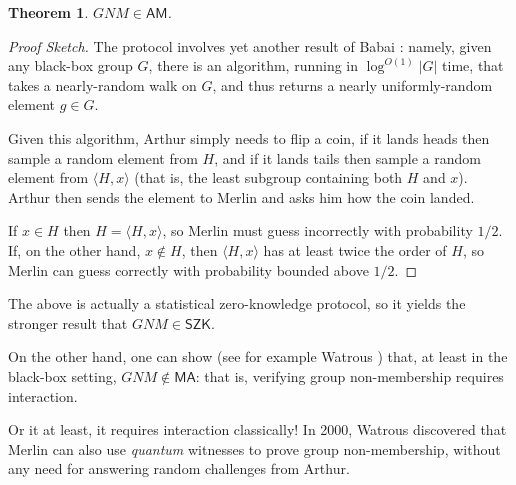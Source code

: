 \documentclass[12pt]{report}
\theoremstyle{plain}
\newtheorem{theorem}{Theorem}[section]
\theoremstyle{definition}
\begin{document}
\begin{theorem}
\label{gnmam}$GNM \in \mathsf{AM}$.
\end{theorem}
\begin{proof}[Proof Sketch] The protocol involves yet another result of Babai \cite{DBLP:conf/stoc/Babai91}: namely, given any black-box group $G$, there is an algorithm, running in $\log^{O(1)} |G|$ time, that takes a nearly-random walk on $G$, and thus returns a nearly uniformly-random element $g\in G$.

Given this algorithm, Arthur simply needs to flip a coin, if it lands heads then sample a random element from $H$, and if it lands tails then sample a random element from $\langle H,x\rangle$ (that is, the least subgroup containing both $H$ and $x$).  Arthur then sends the element to Merlin and asks him how the coin landed.

If $x\in H$ then $H = \langle H,x\rangle$, so Merlin must guess incorrectly with probability $1/2$.  If, on the other hand, $x\not\in H$, then $\langle H,x\rangle$ has at least twice the order of $H$, so Merlin can guess correctly with probability bounded above $1/2$.
\end{proof}

The above is actually a statistical zero-knowledge protocol, so it yields the stronger result that $GNM\in \mathsf{SZK}$.

On the other hand, one can show (see for example Watrous \cite{DBLP:conf/focs/Watrous00}) that, at least in the black-box setting, $GNM\not\in \mathsf{MA}$: that is, verifying group non-membership requires interaction.

Or it at least, it requires interaction classically!  In 2000, Watrous discovered that Merlin can also use {\em quantum} witnesses to prove group non-membership, without any need for answering random challenges from Arthur.
\end{document}
